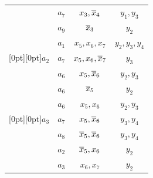 \begin{table}
\begin{center}
\begin{minipage}[t]{190pt}
\begin{tabular}{|c|c|c|c|}




 & $a_7$ & $x_3,\overline x_4$ & $y_1,y_3$\\






 & $a_9$ & $\overline x_3$ & $y_2$\\


\hline




 & $a_1$ & $x_5,x_6,x_7$ & $y_2,y_3,y_4$\\






\multicolumn{1}{|c|}{\raisebox{-6pt}[0pt][0pt]{$a_2$}} & $a_7$ & $x_5,x_6,\overline x_7$ & $y_3$\\






 & $a_6$ & $x_5,\overline x_6$ & $y_2,y_3$\\






 & $a_6$ & $\overline x_5$ & $y_2$\\


\hline




 & $a_6$ & $x_5,x_6$ & $y_2,y_3$\\






\multicolumn{1}{|c|}{\raisebox{-6pt}[0pt][0pt]{$a_3$}} & $a_7$ & $x_5,\overline x_6$ & $y_3,y_4$\\






 & $a_8$ & $\overline x_5,\overline x_6$ & $y_3,y_4$\\






 & $a_2$ & $\overline x_5,x_6$ & $y_2$\\


\hline




 & $a_3$ & $x_6,x_7$ & $y_2$\\







\end{tabular}
\end{minipage}
\end{center}
\end{table}

